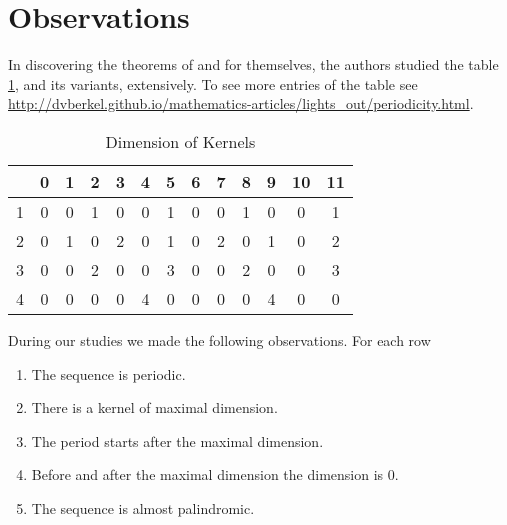 \section{Observations}
In discovering the theorems of \cite{martin01} and \cite{leach17} for
themselves, the authors studied the table \ref{kernels}, and its variants,
extensively. To see more entries of the table see \url{http://dvberkel.github.io/mathematics-articles/lights_out/periodicity.html}.

\begin{table}
  \begin{center}
  \begin{tabular}{|c|cccccccccccc|}
    \hline
    & \phantom{0}0 & \phantom{0}1 & \phantom{0}2 & \phantom{0}3 & \phantom{0}4 & \phantom{0}5 & \phantom{0}6 & \phantom{0}7 & \phantom{0}8 & \phantom{0}9 & 10 & 11 \\
    \hline
    \hline
    1 & 0 & 0 & 1 & 0 & 0 & 1 & 0 & 0 & 1 & 0 & 0 & 1 \\
    2 & 0 & 1 & 0 & 2 & 0 & 1 & 0 & 2 & 0 & 1 & 0 & 2 \\
    3 & 0 & 0 & 2 & 0 & 0 & 3 & 0 & 0 & 2 & 0 & 0 & 3 \\
    4 & 0 & 0 & 0 & 0 & 4 & 0 & 0 & 0 & 0 & 4 & 0 & 0 \\
    \hline
  \end{tabular}
  \end{center}
  \caption{Dimension of Kernels}\label{kernels}
\end{table}

During our studies we made the following observations. For each row

\begin{enumerate}
\item \label{observation.periodic} The sequence is periodic.
\item \label{observation.maximal} There is a kernel of maximal dimension.
\item \label{observation.period} The period starts after the maximal dimension.
\item \label{observation.surround} Before and after the maximal dimension
  the dimension is $0$.
\item \label{observation.palindromic} The sequence is almost palindromic.
\end{enumerate}
